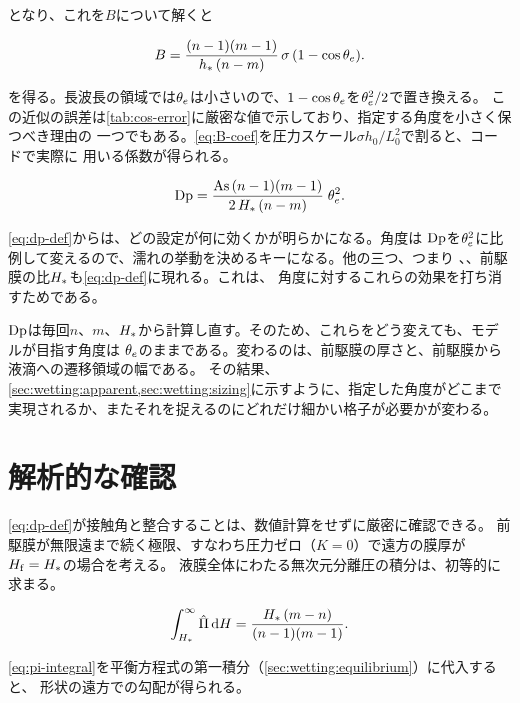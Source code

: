 となり、これを$B$について解くと

\begin{equation}\label{eq:B-coef}
  B = \frac{(n-1)(m-1)}{h_{*}\,(n-m)}\,\sigma\,(1 - \cos\theta_{e}).
\end{equation}

を得る。長波長の領域では$\theta_{e}$は小さいので、$1-\cos\theta_{e}$を$\theta_{e}^{2}/2$で置き換える。
この近似の誤差は\cref{tab:cos-error}に厳密な値で示しており、指定する角度を小さく保つべき理由の
一つでもある。\cref{eq:B-coef}を圧力スケール$\sigma h_0 / L_0^{2}$で割ると、コードで実際に
用いる係数が得られる。

\begin{equation}\label{eq:dp-def}
  \mathrm{Dp} = \frac{\mathrm{As}\,(n-1)(m-1)}{2\,H_{*}\,(n-m)}\;\theta_{e}^{2}.
\end{equation}

\cref{eq:dp-def}からは、どの設定が何に効くかが明らかになる。角度は
$\mathrm{Dp}$を$\theta_{e}^{2}$に比例して変えるので、濡れの挙動を決めるキーになる。他の三つ、つまり
、、前駆膜の比$H_{*}$も\cref{eq:dp-def}に現れる。これは、
角度に対するこれらの効果を打ち消すためである。

\begin{note}[指数や前駆膜の比を変えても目標の角度は変わらない]
  $\mathrm{Dp}$は毎回$n$、$m$、$H_{*}$から計算し直す。そのため、これらをどう変えても、モデルが目指す角度は
  $\theta_{e}$のままである。変わるのは、前駆膜の厚さと、前駆膜から液滴への遷移領域の幅である。
  その結果、\cref{sec:wetting:apparent,sec:wetting:sizing}に示すように、指定した角度がどこまで
  実現されるか、またそれを捉えるのにどれだけ細かい格子が必要かが変わる。
\end{note}

\section{解析的な確認}
\label{sec:wetting:analytic}

\cref{eq:dp-def}が接触角と整合することは、数値計算をせずに厳密に確認できる。
前駆膜が無限遠まで続く極限、すなわち圧力ゼロ（$K = 0$）で遠方の膜厚が$H_{\mathrm{f}} = H_{*}$の場合を考える。
液膜全体にわたる無次元分離圧の積分は、初等的に求まる。

\begin{equation}\label{eq:pi-integral}
  \int_{H_{*}}^{\infty} \hat{\Pi}\,\mathrm{d}H
    = \frac{H_{*}\,(m-n)}{(n-1)(m-1)}.
\end{equation}

\cref{eq:pi-integral}を平衡方程式の第一積分（\cref{sec:wetting:equilibrium}）に代入すると、
形状の遠方での勾配が得られる。

